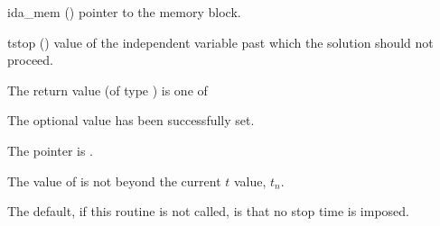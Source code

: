 {{}
{
  \begin{args}
  \item[ida\_mem] ()
    pointer to the {\ida} memory block.
  \item[tstop] ()
    value of the independent variable past which the solution should
    not proceed.
  \end{args}
}
{
  The return value  (of type ) is one of
  \begin{args}
  \item[\Id{IDA\_SUCCESS}]
    The optional value has been successfully set.
  \item[\Id{IDA\_MEM\_NULL}]
    The  pointer is .
  \item[\Id{IDA\_ILL\_INPUT}]
    The value of  is not beyond the current $t$ value, $t_n$.
  \end{args}
}
{
  The default, if this routine is not called, is that no stop time is imposed.

}}
